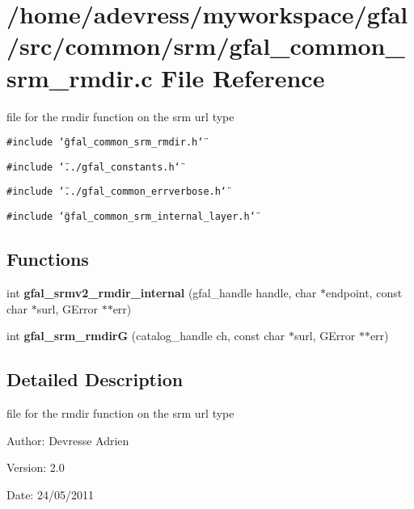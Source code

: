 \section{/home/adevress/myworkspace/gfal/src/common/srm/gfal\_\-common\_\-srm\_\-rmdir.c File Reference}
\label{gfal__common__srm__rmdir_8c}
file for the rmdir function on the srm url type 

{\tt \#include \char`\"{}gfal\_\-common\_\-srm\_\-rmdir.h\char`\"{}}\par
{\tt \#include \char`\"{}../gfal\_\-constants.h\char`\"{}}\par
{\tt \#include \char`\"{}../gfal\_\-common\_\-errverbose.h\char`\"{}}\par
{\tt \#include \char`\"{}gfal\_\-common\_\-srm\_\-internal\_\-layer.h\char`\"{}}\par
\subsection*{Functions}
\begin{CompactItemize}
\item 
int \textbf{gfal\_\-srmv2\_\-rmdir\_\-internal} (gfal\_\-handle handle, char $\ast$endpoint, const char $\ast$surl, GError $\ast$$\ast$err)\label{gfal__common__srm__rmdir_8c_22d081b3d5ca26d2e9cce6de8ee3be1c}

\item 
int \textbf{gfal\_\-srm\_\-rmdir\-G} (catalog\_\-handle ch, const char $\ast$surl, GError $\ast$$\ast$err)\label{gfal__common__srm__rmdir_8c_7bafeabed794ea71168deebf806fbbb8}

\end{CompactItemize}


\subsection{Detailed Description}
file for the rmdir function on the srm url type 

\begin{Desc}
\item[Author:]Devresse Adrien \end{Desc}
\begin{Desc}
\item[Version:]2.0 \end{Desc}
\begin{Desc}
\item[Date:]24/05/2011 \end{Desc}
